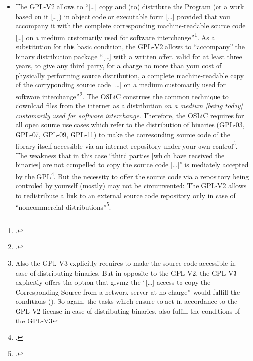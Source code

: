 \begin{itemize}
  \item The GPL-V2 allows to \enquote{[\ldots] copy and (to) distribute the
  Program (or a work based on it [\ldots]) in object code or executable form
  [\ldots] provided that you accompany it with the complete corresponding
  machine-readable source code [\ldots] on a medium customarily used for
  software interchange}\footcite[cf.][\nopage wp.\ §3,
  §3a]{Gpl20OsiLicense1991a}. As a substitution for this basic condition, the
  GPL-V2 allows to \enquote{accompany} the binary distribution package
  \enquote{[\ldots] with a written offer, valid for at least three years, to
  give any third party, for a charge no more than your cost of physically
  performing source distribution, a complete machine-readable copy of the
  corryponding source code [\ldots] on a medium customarily used for software
  interchange}\footcite[cf.][\nopage wp.\ §3b]{Gpl20OsiLicense1991a}. The OSLiC
  construes the common technique to download files from the internet as a
  distribution \emph{on a medium [being today] customarily used for software
  interchange}. Therefore, the OSLiC requires for all open source use cases
  which refer to the distribution of binaries (GPL-03, GPL-07, GPL-09, GPL-11) to
  make the corresonding source code of the library itself accessible via an
  internet repository under your own control\footnote{\label{Gpl3CondCopyleft}
  Also the GPL-V3 explicitly requires to make the source code accessible in
  case of distributing binaries. But in opposite to the GPL-V2, the GPL-V3
  explicitly offers the option that giving the \enquote{[\ldots] access to copy
  the Corresponding Source from a network server at no charge} would fulfill the
  conditions (\cite[cf.][\nopage wp.\ §6 and §6b]{Gpl30OsiLicense2007a}). So
  again, the tasks which ensure to act in accordance to the GPL-V2 license in
  case of distributing binaries, also fulfill the conditions of the GPL-V3}.
  The weakness that in this case \enquote{third parties [which have received the
  binaries] are not compelled to copy the source code [\ldots]} is mediately
  accepted by the GPL\footcite[cf.][\nopage wp.\ §3, at the
  end]{Gpl20OsiLicense1991a}. But the necessity to offer the source code via a
  repository being controled by yourself (mostly) may not be circumvented: The
  GPL-V2 allows to redistribute a link to an external source code repository
  only in case of \enquote{noncommercial distributions}\footcite[cf.][\nopage
  wp.\ §3c]{Gpl20OsiLicense1991a}.
  

\end{itemize}
